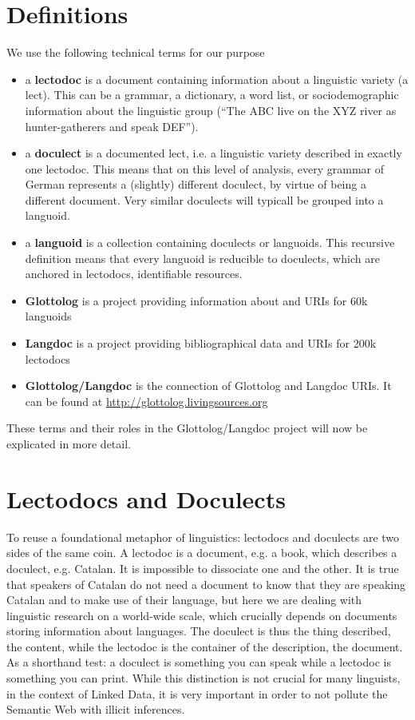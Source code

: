 \documentclass{llncs}
\begin{document}
\section{Definitions}
We use the following technical terms for our purpose
\begin{itemize}
\item a \textbf{lectodoc} is a document containing information about a linguistic variety (a lect). This can be a grammar, a dictionary, a word list, or sociodemographic information about the linguistic group (``The ABC live on the XYZ river as hunter-gatherers and speak DEF'').
\item a \textbf{doculect} is a documented lect, i.e. a linguistic variety described in exactly one lectodoc. This means that on this level of analysis, every grammar of German represents a (slightly) different doculect, by virtue of being a different document. Very similar doculects will typicall be grouped into a languoid.
\item a \textbf{languoid} \citep{ling:GoodHendryx:Categorization} is a collection containing doculects or languoids. This recursive definition means that every languoid is reducible to doculects, which are anchored in lectodocs, identifiable resources.
\item \textbf{Glottolog} is a project providing information about and URIs for 60k languoids
\item \textbf{Langdoc} is a project providing bibliographical data and URIs for 200k lectodocs
\item \textbf{Glottolog/Langdoc}\citep{ling:HammarstromNordhoff:LangDoc} is the connection of Glottolog and Langdoc URIs. It can be found at \url{http://glottolog.livingsources.org} 
\end{itemize}

These terms and their roles in the Glottolog/Langdoc project will now be explicated in more detail.

\section{Lectodocs and Doculects}
To reuse a foundational metaphor of linguistics: lectodocs and doculects are two sides of the same coin. A lectodoc is a document, e.g. a book, which describes a doculect, e.g. Catalan. It is impossible to dissociate one and the other. It is true that speakers of Catalan do not need a document to know that they are speaking Catalan and to make use of their language, but here we are dealing with linguistic research on a world-wide scale, which crucially depends on documents storing information about languages. The doculect is thus the thing described, the content, while the lectodoc is the container of the description, the document. As a shorthand test: a doculect is something you can speak while a lectodoc is something you can print. While this distinction is not crucial for many linguists, in the context of Linked Data, it is very important in order to not pollute the Semantic Web with illicit inferences.
\end{document}
